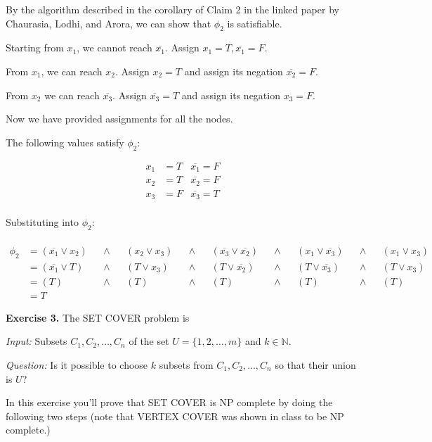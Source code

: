 \documentclass[11pt]{article}
\begin{document}
By the algorithm described in the corollary of Claim 2 in the linked paper by Chaurasia, Lodhi, and Arora, we can show that $\phi_2$ is satisfiable.

Starting from $x_1$, we cannot reach $\overline{x_1}$. Assign $x_1 = T, \overline{x_1} = F$.

From $x_1$, we can reach $x_2$. Assign $x_2 = T$ and assign its negation $\overline{x_2} = F$.

From $x_2$ we can reach $\overline{x_3}$. Assign $\overline{x_3} = T$ and assign its negation $x_3 = F$.

Now we have provided assignments for all the nodes.

The following values satisfy $\phi_2$:

\begin{align*}
  x_1 &= T & \overline{x_1} = F \\
  x_2 &= T & \overline{x_2} = F \\
  x_3 &= F & \overline{x_3} = T \\
\end{align*}

Substituting into $\phi_2$:

\begin{align*}
  && \\
  \phi_2 & = (\overline{x_1} \vee x_2) &&\wedge&& ( x_2  \vee x_3) &&\wedge&&  (\overline{x_3} \vee \overline{x_2}) &&\wedge&& (x_1 \vee \overline{x_3}) &&\wedge&& (x_1 \vee x_3) \\
  & = (\overline{x_1} \vee T) &&\wedge&& ( T  \vee x_3) &&\wedge&&  (T \vee \overline{x_2}) &&\wedge&& (T \vee \overline{x_3}) &&\wedge&& (T \vee x_3)\\
  & = (T) &&\wedge&& (T) &&\wedge&&  (T) &&\wedge&& (T) &&\wedge&& (T) \\
  & = T
\end{align*}

\bigskip

\textbf{Exercise 3.} The  SET COVER problem is

\emph{Input:} Subsets $C_1,  C_2, \ldots, C_n$ of the set $U= \{1,2, \ldots, m\}$ and $k \in \mathbb{N}$.

\emph{Question:} Is it possible to choose $k$ subsets from  $C_1,  C_2, \ldots, C_n$  so that their union is $U$?
\smallskip

In this exercise you'll prove that SET COVER is NP complete by doing the following two steps (note that VERTEX COVER was shown in class to be NP complete.)
\medskip
\end{document}
